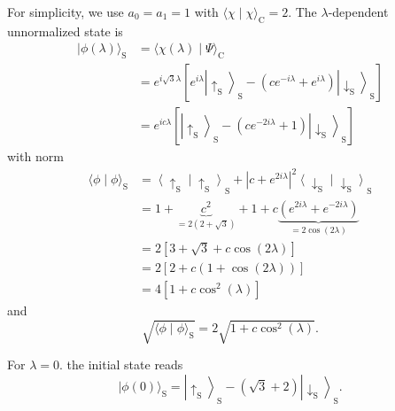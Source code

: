 For simplicity, we use $a_0=a_1=1$ with $\langle\chi \mid \chi\rangle_{\mathrm{C}}=2$. The $\lambda$-dependent unnormalized state is
$$
\begin{aligned}
|\phi(\lambda)\rangle_{\mathrm{S}} & =\langle\chi(\lambda) \mid \Psi\rangle_{\mathrm{C}} \\
& =e^{i \sqrt{3} \lambda}\left[e^{i \lambda}\left|\uparrow_{\mathrm{S}}\right\rangle_{\mathrm{S}}-\left(c e^{-i \lambda}+e^{i \lambda}\right)\left|\downarrow_{\mathrm{S}}\right\rangle_{\mathrm{S}}\right] \\
& =e^{i c \lambda}\left[\left|\uparrow_{\mathrm{S}}\right\rangle_{\mathrm{S}}-\left(c e^{-2 i \lambda}+1\right)\left|\downarrow_{\mathrm{S}}\right\rangle_{\mathrm{S}}\right]
\end{aligned}
$$
with norm
$$
\begin{aligned}
\langle\phi \mid \phi\rangle_{\mathrm{S}} & =\left\langle\uparrow_{\mathrm{S}} \mid \uparrow_{\mathrm{S}}\right\rangle_{\mathrm{S}}+\left|c+e^{2 i \lambda}\right|^2\left\langle\downarrow_{\mathrm{S}} \mid \downarrow_{\mathrm{S}}\right\rangle_{\mathrm{S}} \\
& =1+\underbrace{c^2}_{=2(2+\sqrt{3})}+1+c \underbrace{\left(e^{2 i \lambda}+e^{-2 i \lambda}\right)}_{=2 \cos (2 \lambda)} \\
& =2[3+\sqrt{3}+c \cos (2 \lambda)] \\
& =2[2+c(1+\cos (2 \lambda))] \\
& =4\left[1+c \cos ^2(\lambda)\right]
\end{aligned}
$$
and
$$
\sqrt{\langle\phi \mid \phi\rangle_{\mathrm{S}}}=2 \sqrt{1+c \cos ^2(\lambda)} .
$$

For $\lambda=0$. the initial state reads
$$
|\phi(0)\rangle_{\mathrm{S}}=\left|\uparrow_{\mathrm{S}}\right\rangle_{\mathrm{S}}-(\sqrt{3}+2)\left|\downarrow_{\mathrm{S}}\right\rangle_{\mathrm{S}} .
$$

